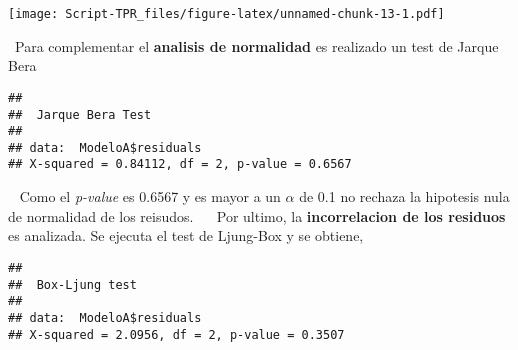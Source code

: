 \documentclass[]{article}
\newenvironment{Shaded}{\begin{snugshade}}{\end{snugshade}}
\newcommand{\DataTypeTok}[1]{\textcolor[rgb]{0.13,0.29,0.53}{#1}}
\newcommand{\DecValTok}[1]{\textcolor[rgb]{0.00,0.00,0.81}{#1}}
\newcommand{\KeywordTok}[1]{\textcolor[rgb]{0.13,0.29,0.53}{\textbf{#1}}}
\newcommand{\NormalTok}[1]{#1}
\newcommand{\OperatorTok}[1]{\textcolor[rgb]{0.81,0.36,0.00}{\textbf{#1}}}
\newcommand{\StringTok}[1]{\textcolor[rgb]{0.31,0.60,0.02}{#1}}
\begin{document}
\begin{Shaded}
\end{Shaded}

\texttt{[image: Script-TPR\_files/figure-latex/unnamed-chunk-13-1.pdf]}

~Para complementar el \textbf{analisis de normalidad} es realizado un
test de Jarque Bera

\begin{Shaded}
\end{Shaded}

\begin{verbatim}
## 
##  Jarque Bera Test
## 
## data:  ModeloA$residuals
## X-squared = 0.84112, df = 2, p-value = 0.6567
\end{verbatim}

~ Como el \emph{p-value} es 0.6567 y es mayor a un \(\alpha\) de 0.1 no
rechaza la hipotesis nula de normalidad de los reisudos. ~ ~Por ultimo,
la \textbf{incorrelacion de los residuos} es analizada. Se ejecuta el
test de Ljung-Box y se obtiene,

\begin{Shaded}
\end{Shaded}

\begin{verbatim}
## 
##  Box-Ljung test
## 
## data:  ModeloA$residuals
## X-squared = 2.0956, df = 2, p-value = 0.3507
\end{verbatim}

\begin{Shaded}
\end{Shaded}
\end{document}
